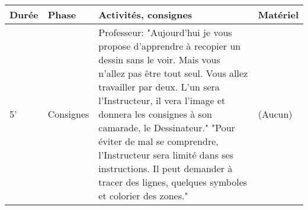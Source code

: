 \documentclass{article}
\begin{document}
\begin{tabular}{| l | p{2cm} | p{9.5cm} | p{3cm} |}
  \hline
  Durée & Phase & Activités, consignes & Matériel \\
  \hline
  5' & Consignes & Professeur: "Aujourd'hui je vous propose d'apprendre à recopier un dessin sans le voir. Mais vous n'allez pas être tout seul. Vous allez travailler par deux. L'un sera l'Instructeur, il vera l'image et donnera les consignes à son camarade, le Dessinateur."\newline
  "Pour éviter de mal se comprendre, l'Instructeur sera limité dans ses instructions. Il peut demander à tracer des lignes, quelques symboles et colorier des zones."& (Aucun) \\ \hline
  \end{tabular}
\end{document}
